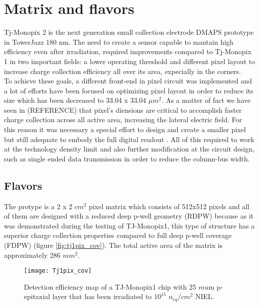 \section{Matrix and flavors}


Tj-Monopix 2 is the next generation small collection electrode DMAPS prototype in TowerJazz 180 nm. The need to create a sensor capable to mantain high efficiency even after irradiation, required improvements compared to Tj-Monopix 1 in two important fields: a lower operating threshold and different pixel layout to increase charge collection efficiency all over its area, expecially in the corners.\\

To achieve these goals, a different front-end in pixel circuit was implemented and a lot of efforts have been focused on optimizing pixel layout in order to reduce its size which has been decreased to 33.04 x 33.04 $\mu m^{2}$. As a matter of fact we have seen in (REFERENCE) that pixel's diensions are critical to accomplish faster charge collection across all active area, increasing the lateral electric field. For this reason it was necessary a special effort to design and create a smaller pixel but still adequate to embody the full digital readout . All of this required to work at the technology density limit and also further modification at the circuit design, such as single ended data transmission in order to reduce the column-bus width.





\subsection{Flavors}

The protype is a 2 x 2 $cm^{2}$ pixel matrix which consists of 512x512 pixels and all of them are designed with a reduced deep p-well geometry (RDPW) because as it was demonstrated during the testing of TJ-Monopix1, this type of structure has a superior charge collection properties compared to full deep p-well coverage (FDPW) (figure \vref{fig:tj1pix_cov}). The total active area of the matrix is approximately 286 $mm^{2}$. 

\begin{figure}[h!]
\centering
\texttt{[image: Tj1pix\_cov]}
\caption{Detection efficiency map of a TJ-Monopix1 chip with 25 $mu$m p-epitaxial layer that has been irradiated to $10^{15}$ $n_{\textit{eq}}$/$cm^{2}$ NIEL.}
\label{fig:tj1pix_cov}
\end{figure}

